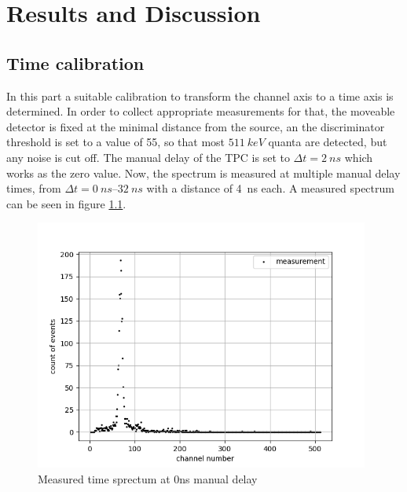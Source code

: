 \chapter{Results and Discussion}

\section{Time calibration}
\label{chap:time cal}
In this part a suitable calibration to transform the channel axis to a time axis is determined. In order to collect appropriate measurements for that, the moveable detector is fixed at the minimal distance from the source, an the discriminator threshold is set to a value of 55, so that most $\SI{511}{keV}$ quanta are detected, but any noise is cut off. The manual delay of the TPC is set to $\Delta t = \SI{2}{ns}$ which works as the zero value. Now, the spectrum is measured at multiple manual delay times, from $\Delta t = \SIrange[]{0}{32}{ns}$ with a distance of \SI{4}{ns} each. A measured spectrum can be seen in figure \ref{fig:0nsnofit}.

\begin{figure}[H]
    \centering
    \includegraphics[width=110mm,scale=0.5]{Positronium/include/0nsnofit.png}
    \caption{Measured time sprectum at 0ns manual delay} 
    \label{fig:0nsnofit}
\end{figure}

